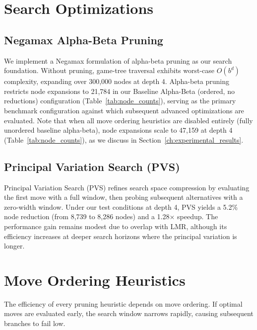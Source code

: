 \section{Search Optimizations}

\subsection{Negamax Alpha-Beta Pruning}
We implement a Negamax formulation of alpha-beta pruning as our search foundation. Without pruning, game-tree traversal exhibits worst-case $O(b^d)$ complexity, expanding over 300,000 nodes at depth 4. Alpha-beta pruning restricts node expansions to 21,784 in our Baseline Alpha-Beta (ordered, no reductions) configuration (Table~\ref{tab:node_counts}), serving as the primary benchmark configuration against which subsequent advanced optimizations are evaluated. Note that when all move ordering heuristics are disabled entirely (fully unordered baseline alpha-beta), node expansions scale to 47,159 at depth 4 (Table~\ref{tab:node_counts}), as we discuss in Section~\ref{ch:experimental_results}.

\subsection{Principal Variation Search (PVS)}
Principal Variation Search (PVS) refines search space compression by evaluating the first move with a full window, then probing subsequent alternatives with a zero-width window. Under our test conditions at depth 4, PVS yields a 5.2\% node reduction (from 8,739 to 8,286 nodes) and a 1.28× speedup. The performance gain remains modest due to overlap with LMR, although its efficiency increases at deeper search horizons where the principal variation is longer.

\section{Move Ordering Heuristics}
The efficiency of every pruning heuristic depends on move ordering. If optimal moves are evaluated early, the search window narrows rapidly, causing subsequent branches to fail low.

